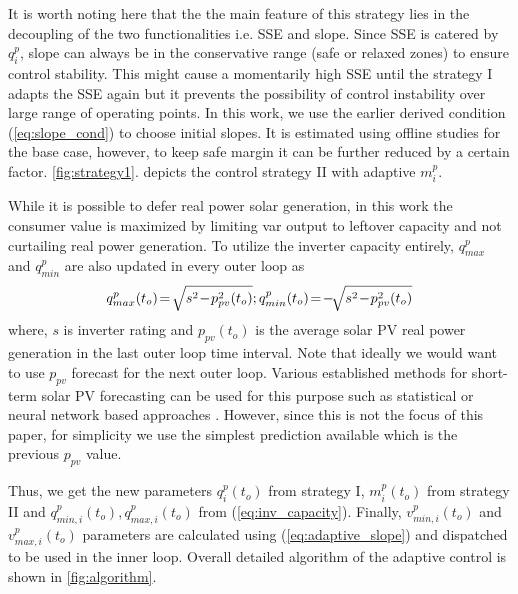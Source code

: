 \documentclass[journal]{IEEEtran}
\begin{document}
It is worth noting here that the the main feature of this strategy lies in the decoupling of the two functionalities i.e. SSE and slope. Since SSE is catered by $q_i^p$, slope can always be in the conservative range (safe or relaxed zones) to ensure control stability. {This might cause a momentarily high SSE until the strategy I adapts the SSE again but it prevents the possibility of control instability over large range of operating points}. In this work, we use the earlier derived condition (\ref{eq:slope_cond}) to choose initial slopes. It is estimated using offline studies for the base case, however, to keep safe margin it can be further reduced by a certain factor. \figurename\ref{fig:strategy1}. depicts the control strategy II with adaptive $m^p_i$.

While it is possible to defer real power solar generation, in this work the consumer value is maximized by limiting var output to leftover capacity and not curtailing real power generation. To utilize the inverter capacity entirely, $q_{max}^p$ and $q_{min}^p$ are also updated in every outer loop as 
\begin{equation}
\small
\label{eq:inv_capacity}
q_{max}^p(t_o)\!=\!\sqrt{s^2\!-\!p_{pv}^2(t_o)}; q_{min}^p(t_o)\!=\!-\!\sqrt{s^2\!-\!p_{pv}^2(t_o)}
\end{equation}
where, $s$ is inverter rating and $p_{pv}(t_o)$ is the average solar PV real power generation in the last outer loop time interval. {Note that ideally we would want to use $p_{pv}$ forecast for the next outer loop. Various established methods for short-term solar PV forecasting can be used for this purpose such as statistical or neural network based approaches} \cite{pvforecast_2015}.{ However, since this is not the focus of this paper, for simplicity we use the simplest prediction available which is the previous $p_{pv}$ value.}   

Thus, we get the new parameters {\small $q_i^p (t_o)$} from strategy I, {\small $m_i^p(t_o)$} from strategy II and {\small $ q_{min,i}^p(t_o), q_{max,i}^p(t_o)$} from (\ref{eq:inv_capacity}). 
Finally, {\small $v_{min,i}^p(t_o)$  and $v_{max,i}^p(t_o)$} parameters are calculated using (\ref{eq:adaptive_slope}) %
and dispatched to be used in the inner loop. Overall detailed algorithm of the adaptive control is shown in \figurename \ref{fig:algorithm}. 
\end{document}

